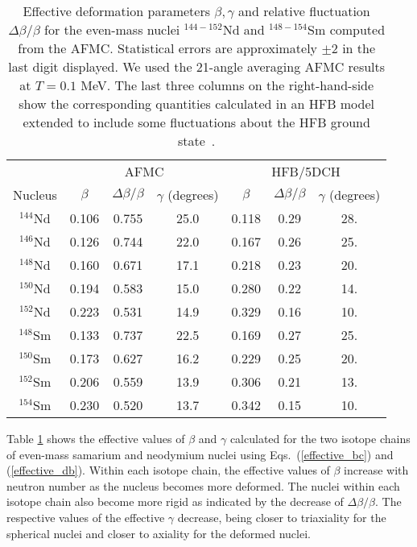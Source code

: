 \documentclass[prc,twocolumn,aps,showpacs,floatfix,nofootinbib,letterpaper,preprintnumbers]{revtex4-1}
\begin{document}
\begin{table}[h]
  \begin{ruledtabular}\label{Table1}
    \begin{tabular}{c | c c c | c c c}
              & \multicolumn{3}{c|}{AFMC} & \multicolumn{3}{c}{HFB/5DCH} \\
      Nucleus & $\beta$ & $\Delta \beta / \beta$ & $\gamma$ (degrees)& $\beta$ & $\Delta \beta / \beta$ & $\gamma$ (degrees)\\
      \hline
      $^{144}$Nd & 0.106 & 0.755 & 25.0 & 0.118  &  0.29  &  28.  \\
      $^{146}$Nd & 0.126 & 0.744 & 22.0 & 0.167  &  0.26  &  25.
 \\
      $^{148}$Nd & 0.160 & 0.671 & 17.1  & 0.218  &  0.23  &  20.
\\
      $^{150}$Nd & 0.194 & 0.583 & 15.0  & 0.280  &  0.22  &  14.
\\
      $^{152}$Nd & 0.223 & 0.531 & 14.9  & 0.329  &  0.16  &  10.
\\
      $^{148}$Sm & 0.133 & 0.737 & 22.5  & 0.169  &  0.27  &  25.
 \\
      $^{150}$Sm & 0.173 & 0.627 & 16.2 & 0.229  &  0.25  &  20.
 \\
      $^{152}$Sm & 0.206 & 0.559 & 13.9 & 0.306  &  0.21  &  13.
 \\
      $^{154}$Sm & 0.230 & 0.520 & 13.7  & 0.342  &  0.15  &  10.
\\
    \end{tabular}
  \end{ruledtabular}
  \caption{Effective deformation parameters $\beta,\gamma$ and 
relative fluctuation $\Delta \beta/\beta$  for the even-mass nuclei 
$^{144-152}$Nd and $^{148-154}$Sm computed from the AFMC. 
Statistical errors are approximately $\pm 2$ in the last digit 
displayed. We used the 21-angle averaging AFMC results at $T=0.1$ MeV.
The last three columns on the right-hand-side show the corresponding quantities calculated
in an HFB model extended to include some fluctuations about the HFB
ground state~\cite{de10}. }
\end{table}

Table \ref{Table1} shows the effective values of $\beta$ and $\gamma$ calculated for the two isotope chains of even-mass samarium and neodymium nuclei using Eqs.~(\ref{effective_bc}) and (\ref{effective_db}).  Within each isotope chain, the effective values of $\beta$ increase with neutron number as the nucleus becomes more deformed. The nuclei within each isotope chain also become more rigid as indicated by the decrease of $\Delta \beta/\beta$. The respective values of the effective $\gamma$ decrease, being closer to triaxiality for the spherical nuclei and closer to axiality for the deformed nuclei.
\end{document}
